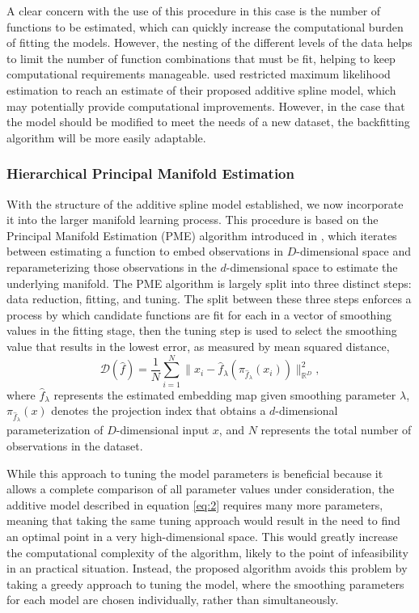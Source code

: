 \documentclass[11pt,reqno]{article}
\theoremstyle{definition}
\begin{document}
A clear concern with the use of this procedure in this case is the number of functions to be estimated, which can quickly increase the computational burden of fitting the models. However, the nesting of the different levels of the data helps to limit the number of function combinations that must be fit, helping to keep computational requirements manageable. \cite{brumbackSmoothingSplineModels1998} used restricted maximum likelihood estimation to reach an estimate of their proposed additive spline model, which may potentially provide computational improvements. However, in the case that the model should be modified to meet the needs of a new dataset, the backfitting algorithm will be more easily adaptable. 

\subsubsection{Hierarchical Principal Manifold Estimation}

With the structure of the additive spline model established, we now incorporate it into the larger manifold learning process. This procedure is based on the Principal Manifold Estimation (PME) algorithm introduced in \cite{mengPrincipalManifoldEstimation2021}, which iterates between estimating a function to embed observations in $D$-dimensional space and reparameterizing those observations in the $d$-dimensional space to estimate the underlying manifold. The PME algorithm is largely split into three distinct steps: data reduction, fitting, and tuning. The split between these three steps enforces a process by which candidate functions are fit for each in a vector of smoothing values in the fitting stage, then the tuning step is used to select the smoothing value that results in the lowest error, as measured by mean squared distance,
\[%
  \mathcal{D}(\hat{f}) = \frac{1}{N}\sum_{i=1}^{N}\|x_i - \hat{f}_\lambda\left(\pi_{\hat{f}_\lambda}(x_i)\right)\|_{\mathbb{R}^{D}}^2
,\]%
where $\hat{f}_\lambda$ represents the estimated embedding map given smoothing parameter $\lambda$, $\pi_{\hat{f}_\lambda}(x)$ denotes the projection index that obtains a $d$-dimensional parameterization of $D$-dimensional input $x$, and $N$ represents the total number of observations in the dataset.

While this approach to tuning the model parameters is beneficial because it allows a complete comparison of all parameter values under consideration, the additive model described in equation \ref{eq:2} requires many more parameters, meaning that taking the same tuning approach would result in the need to find an optimal point in a very high-dimensional space. This would greatly increase the computational complexity of the algorithm, likely to the point of infeasibility in an practical situation. Instead, the proposed algorithm avoids this problem by taking a greedy approach to tuning the model, where the smoothing parameters for each model are chosen individually, rather than simultaneously. 
\end{document}
